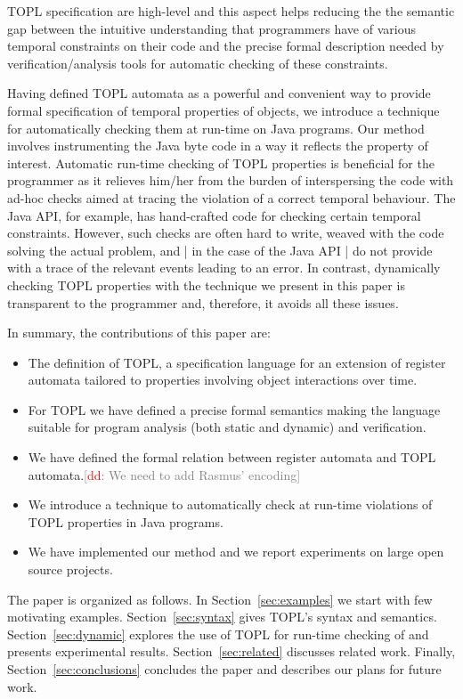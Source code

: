\documentclass{sigplanconf}[10pt] %
\newcommand{\noterg}[2]{\textcolor{gray}{[\textcolor{red}{#1}: #2]}}
\newcommand{\dd}[1]{\noterg{dd}{#1}}
\begin{document}
TOPL specification are high-level and this aspect helps reducing the the semantic gap between the intuitive understanding that programmers have of various temporal constraints on their code and the precise formal description needed by verification/analysis tools for automatic checking of these constraints.

Having defined TOPL automata as a powerful and convenient way to provide formal specification of temporal properties of objects,  we introduce a technique for automatically checking them at run-time on Java programs.
Our method involves instrumenting the Java byte code in a way it reflects the property of interest.
Automatic run-time checking of TOPL properties is beneficial for the programmer as it relieves him/her from the burden of interspersing the code with ad-hoc checks  aimed at tracing the violation of a correct temporal behaviour.
The Java API, for example, has hand-crafted code for checking certain temporal constraints.
However, such checks are often hard to write, weaved with the code solving the actual problem, and | in the case of the Java API |  do not provide with a trace of the relevant events leading to an error.
In contrast, dynamically checking TOPL properties  with the technique we present in this paper is transparent to the programmer and, therefore,  it avoids all these issues.

In summary, the contributions of this paper are:
\begin{itemize}
\item The definition of TOPL, a specification language for an extension of register automata tailored to properties involving object interactions over time.
\item For TOPL we have defined a precise formal semantics making the language suitable for program analysis (both static and dynamic) and verification.
\item We have defined the formal relation between register automata and TOPL automata.\dd{We need to add Rasmus' encoding}
\item We introduce a technique to automatically check at run-time violations of TOPL properties in Java programs.
\item We have implemented our method and we report experiments on large open source projects.
\end{itemize}

The paper is organized as follows.
In Section~\ref{sec:examples} we start with few motivating examples.
Section~\ref{sec:syntax} gives  TOPL's syntax  and semantics.
Section~\ref{sec:dynamic} explores the use of TOPL for run-time checking of and presents experimental results.
Section~\ref{sec:related} discusses related work.
Finally, Section~\ref{sec:conclusions} concludes the paper and describes our plans for future work.
\end{document}
